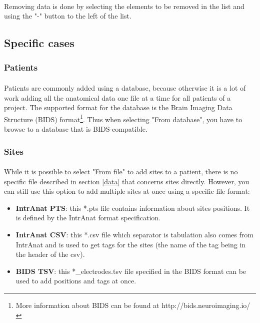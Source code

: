 \documentclass[a4paper]{article}
\begin{document}
\paragraph{} Removing data is done by selecting the elements to be removed in the list and using the "-" button to the left of the list.
\subsection{Specific cases}
\subsubsection{Patients}
\paragraph{} Patients are commonly added using a database, because otherwise it is a lot of work adding all the anatomical data one file at a time for all patients of a project. The supported format for the database is the Brain Imaging Data Structure (BIDS) format\footnote{More information about BIDS can be found at http://bids.neuroimaging.io/}. Thus when selecting "From database", you have to browse to a database that is BIDS-compatible.
\subsubsection{Sites}
\paragraph{} While it is possible to select "From file" to add sites to a patient, there is no specific file described in section \ref{data} that concerns sites directly. However, you can still use this option to add multiple sites at once using a specific file format:
\begin{itemize}
\item \textbf{IntrAnat PTS}: this *.pts file contains information about sites positions. It is defined by the IntrAnat format specification.
\item \textbf{IntrAnat CSV}: this *.csv file which separator is tabulation also comes from IntrAnat and is used to get tags for the sites (the name of the tag being in the header of the csv).
\item \textbf{BIDS TSV}: this *\_electrodes.tsv file specified in the BIDS format can be used to add positions and tags at once.
\end{itemize}
\end{document}
